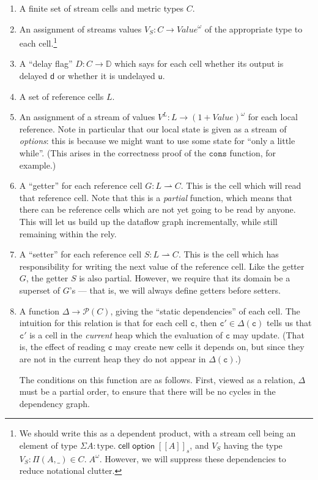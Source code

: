 \documentclass[preprint]{sigplanconf}
\newcommand{\term}[1]{\ensuremath{\mathtt{{#1}}}}
\newcommand{\interps}[1]{[\![{#1}]\!]_s}
\newcommand{\celltype}[1]{\mathsf{cell}\;{#1}}
\newcommand{\opttype}[1]{\mathsf{option}\;{#1}}
\newcommand{\powerset}[1]{\mathcal{P}(#1)}
\newcommand{\Delays}{\mathbb{D}}
\newcommand{\U}{\mathsf{u}}
\newcommand{\D}{\mathsf{d}}
\begin{document}
\begin{enumerate}
\item A finite set of stream cells and metric types $C$. 
\item An assignment of streams values $V_S : C \to \mathit{Value}^\omega$ 
  of the appropriate type to each cell.\footnote{We should write this 
  as a dependent product, with a stream cell being an element of type 
  $\Sigma A:\mathrm{type}.\;\celltype{\opttype{\interps{A}}}$, and $V_S$ having
  the type $V_S : \Pi (A, \_) \in C.\; A^\omega$. However, we will suppress these 
  dependencies to reduce notational clutter.}
\item A ``delay flag'' $D : C \to \Delays$ which says for each cell whether 
  its output is delayed $\D$ or whether it is undelayed $\U$. 
\item A set of reference cells $L$. 
\item An assignment of a stream of values $V^L : L \to \mathit{(1 +
  \mathit{Value})^\omega}$ for each local reference. Note in
  particular that our local state is given as a stream of
  \emph{options}: this is because we might want to use some state for
  ``only a little while''. (This arises in the correctness proof of the 
  \term{cons} function, for example.)
\item A ``getter'' for each reference cell $G : L \rightharpoonup
  C$. This is the cell which will read that reference cell. Note that
  this is a \emph{partial} function, which means that there can be
  reference cells which are not yet going to be read by anyone. This
  will let us build up the dataflow graph incrementally, while still
  remaining within the rely. 
\item A ``setter'' for each reference cell $S : L \rightharpoonup
  C$. This is the cell which has responsibility for writing the next
  value of the reference cell. Like the getter $G$, the getter $S$ is
  also partial. However, we require that its domain be a superset of $G$'s ---
  that is, we will always define getters before setters. 

\item A function $\Delta \to \powerset{C}$, giving the ``static
  dependencies'' of each cell. The intuition for this relation is that
  for each cell \term{c}, then $\term{c'} \in \Delta(\term{c})$ tells
  us that \term{c'} is a cell in the \emph{current} heap which the
  evaluation of \term{c} may update. (That is, the effect of reading
  \term{c} may create new cells it depends on, but since they are not
  in the current heap they do not appear in $\Delta(\term{c})$.)

  The conditions on this function are as follows. First, viewed as a
  relation, $\Delta$ must be a partial order, to ensure that there
  will be no cycles in the dependency graph. 
\end{enumerate}
\end{document}
